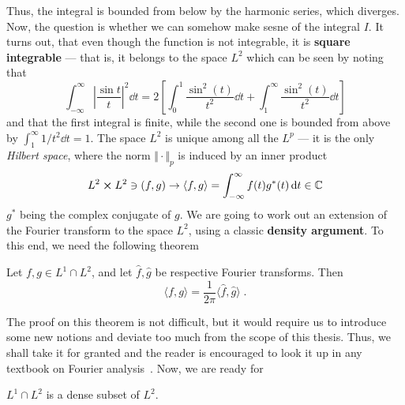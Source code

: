 Thus, the integral is bounded from below by the harmonic series, which diverges.
Now, the question is whether we can somehow make sesne of the integral \(I\).
It turns out, that
even though the function is not integrable, it is \textbf{square integrable} --- that is, it belongs to the
space \(L^2\)
which can be seen by noting that
\begin{equation}
    \int_{-\infty }^{\infty}\left|\frac{\sin t}t\right|^2 \dd{t}  =
    2\left[ \int_{0}^{1}  \frac{\sin^2(t)}{t^2}\dd{t}  + \int_{1}^{\infty }  \frac{\sin^2(t)}{t^2}  \dd{t}  \right]
\end{equation}
and that the first integral is finite, while the second one is bounded from above by \(\int_{1}^{\infty} 1/t^2 \dd{t} = 1\).
The space \(L^2\) is unique among all the \(L^p\) --- it is the only \textit{Hilbert space},
where the norm \(\Vert \cdot \Vert_p \) is induced by an inner product
\begin{equation}
    L^2 \cross L^2 \ni (f,g) \to \langle f,g \rangle = \int_{-\infty}^{\infty} f(t)g^*(t) \dd{t} \in \mathbb{C}
\end{equation}
\(g^*\) being the complex conjugate of \(g\). We are going to work out an extension of the Fourier transform
to the space \(L^2\), using a classic \textbf{density argument}. To this end, we need the following theorem
\begin{theorem}

    Let \(f,g \in L^1 \cap L^2\), and let \(\hat{f},\hat{g}\) be respective Fourier transforms. Then
    \begin{equation*}
        \langle f,g \rangle = \frac{1}{2\pi }\langle \hat{f} ,\hat{g}  \rangle  \; .
    \end{equation*}
\end{theorem}
The proof on this theorem is not difficult, but it would require us to introduce some new notions and deviate
too much from the scope of this thesis. Thus, we shall take it for granted and the reader is encouraged to
look it up in any textbook on Fourier analysis~\autocite{Rudin1987,Stein2011}. Now, we are ready for
\begin{theorem}
    \(L^1 \cap L^2\) is a dense subset of \(L^2\).
\end{theorem}
